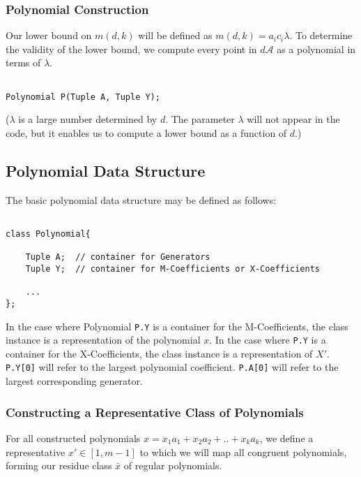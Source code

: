 \subsubsection{Polynomial Construction}

Our lower bound on $m(d, k)$ will be defined as $m(d, k) = a_{i}c_{i} \lambda$. To determine the validity of the lower bound, we compute every point in $d \mathscr{A}$ as a polynomial in terms of $\lambda$.\n

\begin{lstlisting}

Polynomial P(Tuple A, Tuple Y);

\end{lstlisting}

\noindent
($\lambda$ is a large number determined by $d$. The parameter $\lambda$ will not appear in the code, but it enables us to compute a lower bound as a function of $d$.)\n

\subsection*{Polynomial Data Structure} The basic polynomial data structure may be defined as follows:

\begin{lstlisting}

class Polynomial{

    Tuple A;  // container for Generators
    Tuple Y;  // container for M-Coefficients or X-Coefficients

    ...
};

\end{lstlisting}

In the case where Polynomial \lstinline{P.Y} is a container for the M-Coefficients, the class instance is a representation of the polynomial $x$. In the case where \lstinline{P.Y} is a container for the X-Coefficients, the class instance is a representation of $X'$.
\lstinline{P.Y[0]} will refer to the largest polynomial coefficient. \lstinline{P.A[0]} will refer to the largest corresponding generator.

\subsubsection{Constructing a Representative Class of Polynomials}

For all constructed polynomials $x = x_1a_{1} + x_2a_{2} + .. + x_{k}a_{k}$, we define a representative $x' \in [1, m-1]$ to which we will map all congruent polynomials, forming our residue class $\bar{x}$ of regular polynomials.\n

